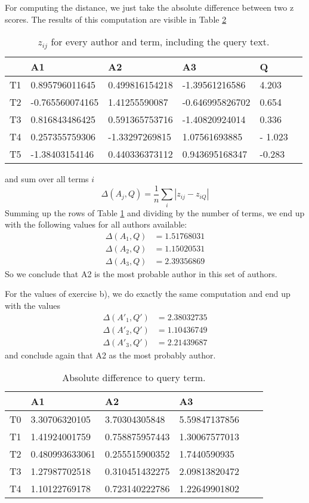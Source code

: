 \documentclass[11pt]{article}
\begin{document}
For computing the distance, we just take the
absolute difference between two z scores. The results of this computation are visible in Table \ref{table:abs_diff}
\begin{table}[h]
\center
\begin{tabular}{|l|l|l|l|l|l|}
\hline
	 & A1 & A2 & A3 & Q \\
	 \hline
T1 & 0.895796011645 & 0.499816154218 & -1.39561216586 & 4.203 \\
 \hline 
T2 & -0.765560074165 & 1.41255590087 & -0.646995826702 & 0.654\\
 \hline 
T3 & 0.816843486425 & 0.591365753716 & -1.40820924014 & 0.336\\
 \hline 
T4 & 0.257355759306 & -1.33297269815 & 1.07561693885 & - 1.023\\
 \hline 
T5 & -1.38403154146 & 0.440336373112 & 0.943695168347 & -0.283 \\
\hline
\end{tabular}
\caption{$z_{ij}$ for every author and term, including the query text. }
\label{table:zscores}
\end{table}
and sum over all terms $i$
\begin{equation}
	\Delta(A_j, Q) = \frac{1}{n} \sum_i | z_{ij} - z_{iQ} |
\end{equation}
Summing up the rows of Table \ref{table:zscores} and dividing by the number
of terms, we end up with the following values for all authors available:
\begin{align*}
	 \Delta(A_1, Q) &= 1.51768031 \\
	 \Delta(A_2, Q) &= 1.15020531 \\
	 \Delta(A_3, Q) &= 2.39356869
\end{align*}
So we conclude that A2 is the most probable author in this set of authors.

For the values of exercise b), we do exactly the same computation and end up with the values
\begin{align*}
	 \Delta(A'_1, Q') &= 2.38032735 \\
	 \Delta(A'_2, Q') &= 1.10436749 \\
	 \Delta(A'_3, Q') &= 2.21439687
\end{align*}
and conclude again that A2 as the most probably author.
\begin{table}
\center
\begin{tabular}{|l|l|l|l|l|l|}
\hline
	 & A1 & A2 & A3 \\
	 \hline
T0 & 3.30706320105 & 3.70304305848 & 5.59847137856 \\
 \hline 
T1 & 1.41924001759 & 0.758875957443 & 1.30067577013 \\
 \hline 	
T2 & 0.480993633061 & 0.255515900352 & 1.7440590935 \\
 \hline 
T3 & 1.27987702518 & 0.310451432275 & 2.09813820472 \\
 \hline 
T4 & 1.10122769178 & 0.723140222786 & 1.22649901802 \\
 \hline
\end{tabular}
\caption{Absolute difference to query term.}
\label{table:abs_diff}
\end{table}
\end{document}
